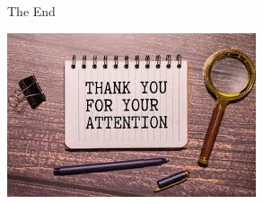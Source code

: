 \documentclass{beamer}
\begin{document}
\begin{frame}{The End}

\centering
    \includegraphics[width=\textwidth, height=\textheight, keepaspectratio]{image3/Thankyou.jpg}



    
\end{frame}
\end{document}
